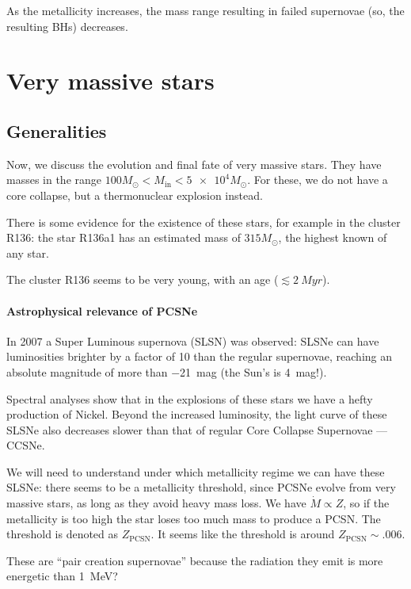\documentclass[main.tex]{subfiles}
\begin{document}
As the metallicity increases, the mass range resulting in failed supernovae (so, the resulting BHs) decreases. 

\section{Very massive stars}

\subsection{Generalities}

Now, we discuss the evolution and final fate of very massive stars. 
They have masses in the range \(100 M_{\odot} < M _{\text{in}} < \num{5e4}M_{\odot}\). 
For these, we do not have a core collapse, but a thermonuclear explosion instead. 

There is some evidence for the existence of these stars, for example in the cluster R136: the star R136a1 has an estimated mass of \(315M_{\odot}\), the highest known of any star. 

The cluster R136 seems to be very young, with an age (\(\lesssim \SI{2}{Myr}\)). 

\paragraph{Astrophysical relevance of PCSNe}

In 2007 a Super Luminous supernova (SLSN) was observed: SLSNe can have luminosities brighter by a factor of 10 than the regular supernovae, reaching an absolute magnitude of more than \SI{-21}{mag} (the Sun's is \SI{4}{mag}!). 

Spectral analyses show that in the explosions of these stars we have a hefty production of Nickel.
Beyond the increased luminosity, the light curve of these SLSNe also decreases slower than that of regular Core Collapse Supernovae --- CCSNe.

We will need to understand under which metallicity regime we can have these SLSNe: there seems to be a metallicity threshold, since PCSNe evolve from very massive stars, as long as they avoid heavy mass loss. 
We have \(\dot{M} \propto Z\), so if the metallicity is too high the star loses too much mass to produce a PCSN. The threshold is denoted as \(Z _{\text{PCSN}}\).
It seems like the threshold is around \(Z _{\text{PCSN}}\sim \num{.006}\).

These are ``pair creation supernovae'' because the radiation they emit is more energetic than \SI{1}{MeV}? 
\end{document}
